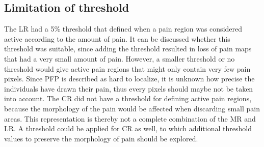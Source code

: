 \subsection{Limitation of threshold}
The LR had a 5\% threshold that defined when a pain region was considered active according to the amount of pain. It can be discussed whether this threshold was suitable, since adding the threshold resulted in loss of pain maps that had a very small amount of pain. However, a smaller threshold or no threshold would give active pain regions that might only contain very few pain pixels. Since PFP is described as hard to localize, it is unknown how precise the individuals have drawn their pain, thus every pixels should maybe not be taken into account.
The CR did not have a threshold for defining active pain regions, because the morphology of the pain would be affected when discarding small pain areas. This representation is thereby not a complete combination of the MR and LR. A threshold could be applied for CR as well, to which additional threshold values to preserve the morphology of pain should be explored. 

